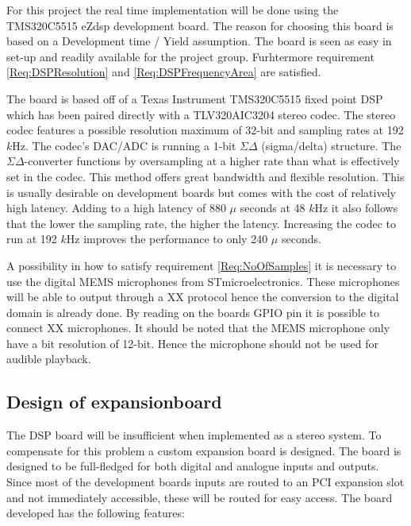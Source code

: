 For this project the real time implementation will be done using the TMS320C5515 eZdsp development board. The reason for choosing this board is based on a Development time / Yield assumption. The board is seen as easy in set-up and readily available for the project group. Furhtermore requirement \ref{Req:DSPResolution} and \ref{Req:DSPFrequencyArea} are satisfied.

The board is based off of a Texas Instrument TMS320C5515 fixed point DSP which has been paired directly with a TLV320AIC3204 stereo codec. The stereo codec features a possible resolution maximum of 32-bit and sampling rates at 192 $k$Hz. The codec's DAC/ADC is running a 1-bit $\Sigma\Delta$ (sigma/delta) structure. The $\Sigma\Delta$-converter functions by oversampling at a higher rate than what is effectively set in the codec. This method offers great bandwidth and flexible resolution. This is usually desirable on development boards but comes with the cost of relatively high latency. Adding to a high latency of 880 $\mu$ seconds at 48 $k$Hz it also follows that the lower the sampling rate, the higher the latency. Increasing the codec to run at 192 $k$Hz improves the performance to only 240 $\mu$ seconds.

A possibility in how to satisfy requirement \ref{Req:NoOfSamples} it is necessary to use the digital MEMS microphones from STmicroelectronics. These microphones will be able to output through a XX protocol hence the conversion to the digital domain is already done. By reading on the boards GPIO pin it is possible to connect XX microphones. It should be noted that the MEMS microphone only have a bit resolution of 12-bit. Hence the microphone should not be used for audible playback.


\subsection{Design of expansionboard}\label{subsec:DesignOfExpansion}

The DSP board will be insufficient when implemented as a stereo system. To compensate for this problem a custom expansion board is designed. The board is designed to be full-fledged for both digital and analogue inputs and outputs. Since most of the development boards inputs are routed to an PCI expansion slot and not immediately accessible, these will be routed for easy access. The board developed has the following features:

